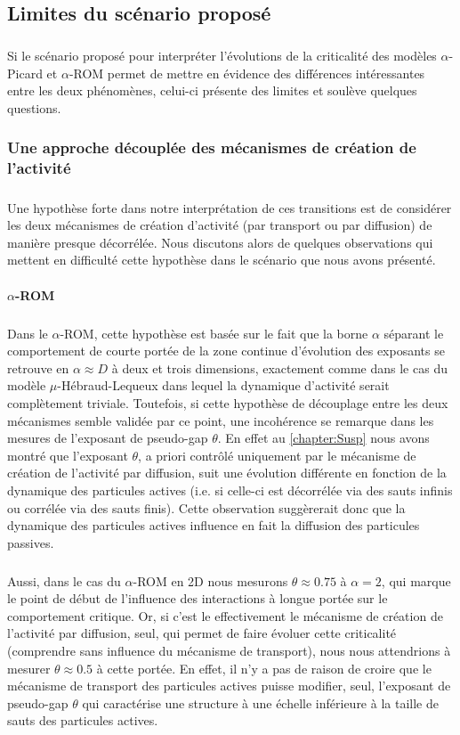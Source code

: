 \subsection{Limites du scénario proposé}

\subparagraph{}Si le scénario proposé pour interpréter l'évolutions de la criticalité des modèles $\alpha$-Picard et $\alpha$-ROM permet de mettre en évidence des différences intéressantes entre les deux phénomènes, celui-ci présente des limites et soulève quelques questions.

\subsubsection{Une approche découplée des mécanismes de création de l'activité}

\subparagraph{}Une hypothèse forte dans notre interprétation de ces transitions est de considérer les deux mécanismes de création d'activité (par transport ou par diffusion) de manière presque décorrélée. Nous discutons alors de quelques observations qui mettent en difficulté cette hypothèse dans le scénario que nous avons présenté.

\paragraph{$\alpha$-ROM}

\subparagraph{}Dans le $\alpha$-ROM, cette hypothèse est basée sur le fait que la borne $\alpha$ séparant le comportement de courte portée de la zone continue d'évolution des exposants se retrouve en $\alpha \approx D$ à deux et trois dimensions, exactement comme dans le cas du modèle $\mu$-Hébraud-Lequeux dans lequel la dynamique d'activité serait complètement triviale. Toutefois, si cette hypothèse de découplage entre les deux mécanismes semble validée par ce point, une incohérence se remarque dans les mesures de l'exposant de pseudo-gap $\theta$. En effet au \autoref{chapter:Susp} nous avons montré que l'exposant $\theta$, a priori contrôlé uniquement par le mécanisme de création de l'activité par diffusion, suit une évolution différente en fonction de la dynamique des particules actives (i.e. si celle-ci est décorrélée via des sauts infinis ou corrélée via des sauts finis). Cette observation suggèrerait donc que la dynamique des particules actives influence en fait la diffusion des particules passives. 

\subparagraph{}Aussi, dans le cas du $\alpha$-ROM en 2D nous mesurons $\theta \approx 0.75$ à $\alpha = 2$, qui marque le point de début de l'influence des interactions à longue portée sur le comportement critique. Or, si c'est le effectivement le mécanisme de création de l'activité par diffusion, seul,  qui permet de faire évoluer cette criticalité (comprendre sans influence du mécanisme de transport), nous nous attendrions à mesurer $\theta \approx 0.5$ à cette portée. En effet, il n'y a pas de raison de croire que le mécanisme de transport des particules actives puisse modifier, seul, l'exposant de pseudo-gap $\theta$ qui caractérise une structure à une échelle inférieure à la taille de sauts des particules actives.


